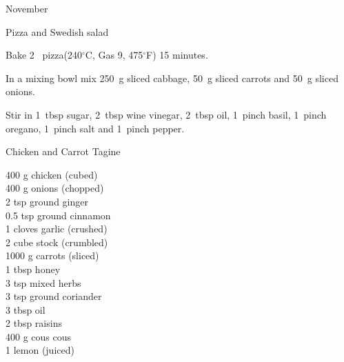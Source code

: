 \begin{menu}{November}
\begin{recipe}{1}{Pizza and Swedish salad}
\begin{ingredients}
		\end{ingredients}
	
	
	
    \begin{instructions}
    \item 
        Bake 2~  pizza(240$^{\circ}$C, Gas 9, 475$^{\circ}$F) 15 minutes.
      \item 
        In a mixing bowl mix
        250~g sliced cabbage,
        50~g sliced carrots
        and
        50~g sliced onions.
      \item 
        Stir in
        1~tbsp  sugar,
        2~tbsp  wine vinegar,
        2~tbsp  oil,
        1~pinch  basil,
        1~pinch  oregano,
        1~pinch  salt
        and
        1~pinch  pepper.
      
    \end{instructions}
    \end{recipe}%
  
    \begin{recipe}{2}{Chicken and Carrot Tagine}%
		\begin{ingredients}
		400 g chicken (cubed) \\
	400 g onions (chopped) \\
	2 tsp ground ginger  \\
	0.5 tsp ground cinnamon  \\
	1 cloves garlic (crushed) \\
	2 cube stock (crumbled) \\
	1000 g carrots (sliced) \\
	1 tbsp honey  \\
	3 tsp mixed herbs  \\
	3 tsp ground coriander  \\
	3 tbsp oil  \\
	2 tbsp raisins  \\
	400 g cous cous  \\
	1  lemon (juiced) \\
	
		\end{ingredients}
	
	

\end{recipe}
\end{menu}
